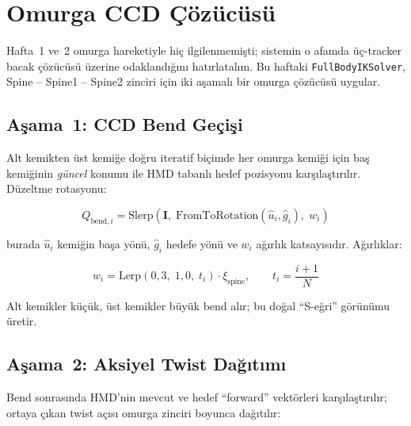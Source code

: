 \documentclass[11pt,a4paper]{article}
\begin{document}
\section{Omurga CCD \c{C}\"oz\"uc\"us\"u}
\label{sec:omurga}

Hafta~1 ve~2 omurga hareketiyle hi\c{c} ilgilenmemi\c{s}ti;
sistemin o afamda \"u\c{c}-tracker bacak \c{c}\"oz\"uc\"us\"u
\"uzerine odakland{\i}\u{g}{\i}n{\i} hat{\i}rlatal{\i}m.
Bu haftaki \texttt{FullBodyIKSolver}, Spine -- Spine1 -- Spine2
zinciri i\c{c}in iki a\c{s}amal{\i} bir omurga \c{c}\"oz\"uc\"us\"u
uygular.

\subsection{A\c{s}ama~1: CCD Bend Ge\c{c}i\c{s}i}

Alt kemikten \"ust kemi\u{g}e do\u{g}ru iteratif bi\c{c}imde
her omurga kemi\u{g}i i\c{c}in ba\c{s} kemi\u{g}inin
\textit{g\"uncel} konumu ile HMD tabanl{\i} hedef pozisyonu
kar\c{s}{\i}la\c{s}t{\i}r{\i}l{\i}r. D\"uzeltme rotasyonu:

\begin{equation}
    Q_{\text{bend},i} =
    \mathrm{Slerp}\!\left(\mathbf{I},\;
    \mathrm{FromToRotation}(\hat{u}_i, \hat{g}_i),\;
    w_i\right)
    \label{eq:ccd}
\end{equation}

\noindent burada $\hat{u}_i$ kemi\u{g}in ba\c{s}a y\"on\"u,
$\hat{g}_i$ hedefe y\"on\"u ve $w_i$ a\u{g}{\i}rl{\i}k
katsay{\i}s{\i}d{\i}r. A\u{g}{\i}rl{\i}klar:

\begin{equation}
    w_i = \mathrm{Lerp}(0{,}3,\;1{,}0,\;t_i)\cdot\xi_{\text{spine}},
    \qquad
    t_i = \frac{i+1}{N}
    \label{eq:ccd_w}
\end{equation}

Alt kemikler k\"u\c{c}\"uk, \"ust kemikler b\"uy\"uk bend al{\i}r;
bu do\u{g}al ``S-e\u{g}ri'' g\"or\"un\"umu \"uretir.

\subsection{A\c{s}ama~2: Aksiyel Twist Da\u{g}{\i}t{\i}m{\i}}

Bend sonras{\i}nda HMD'nin mevcut ve hedef ``forward'' vekt\"orleri
kar\c{s}{\i}la\c{s}t{\i}r{\i}l{\i}r; ortaya \c{c}{\i}kan twist a\c{c}{\i}s{\i}
omurga zinciri boyunca da\u{g}{\i}t{\i}l{\i}r:
\end{document}
